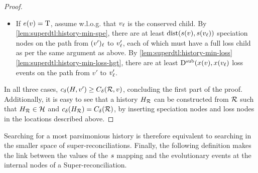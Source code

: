\begin{proof}
\begin{itemize}
        \item If \(e(v) = \mathrm{T}\), assume w.l.o.g. that \(v_\mathit{\ell}\) is the conserved child. By \cref{lem:superdtl:history-min-spe}, there are at least \(\mathrm{dist}(s(v), s(v_\mathit{\ell}))\) speciation nodes on the path from \((v')_\mathit{\ell}\) to \(v'_\mathit{\ell}\), each of which must have a full loss child as per the same argument as above.
        By \cref{lem:superdtl:history-min-loss} \cref{lem:superdtl:history-min-loss-hgt}, there are at least \(\mathrm{D}^\mathrm{sub}(x(v), x(v_\mathit{\ell})\) loss events on the path from \(v'\) to \(v'_\mathit{\ell}\).
    \end{itemize}
    In all three cases, \(c_\delta\kern.1pt(H, v') \geq C_{\delta\kern.1pt}(\mathcal{R}, v)\), concluding the first part of the proof.
    Additionally, it is easy to see that a history \(H_{\mathcal{R}}\) can be constructed from \(\mathcal{R}\) such that \(H_{\mathcal{R}} \in \mathcal{H}\) and \(c_\delta\kern.1pt(H_{\mathcal{R}}) = C_{\delta\kern.1pt}(\mathcal{R})\), by inserting speciation nodes and loss nodes in the locations described above.
\end{proof}

Searching for a most parsimonious history is therefore equivalent to searching in the smaller space of super-reconciliations.
Finally, the following definition makes the link between the values of the \(s\) mapping and the evolutionary events at the internal nodes of a Super-reconciliation.

